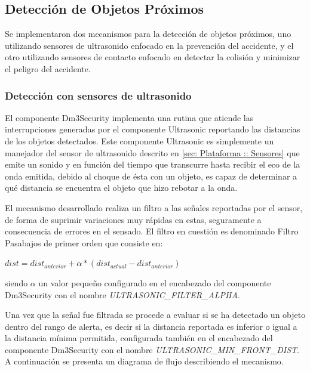 \documentclass[withindex,glossary]{cam-thesis}
\begin{document}
\subsection{Detección de Objetos Próximos} \label{sec:Implementacion :: detección de objetos próximos}
Se implementaron dos mecanismos para la detección de objetos próximos, uno utilizando sensores de ultrasonido enfocado en la prevención del accidente, y el otro utilizando sensores de contacto enfocado en detectar la colisión y minimizar el peligro del accidente.

\subsubsection{Detección con sensores de ultrasonido}
El componente Dm3Security implementa una rutina que atiende las interrupciones generadas por el componente Ultrasonic reportando las distancias de los objetos detectados. Este componente Ultrasonic es simplemente un manejador del sensor de ultrasonido descrito en \ref{sec: Plataforma :: Sensores} que emite un sonido y en función del tiempo que transcurre hasta recibir el eco de la onda emitida, debido al choque de ésta con un objeto, es capaz de determinar a qué distancia se encuentra el objeto que hizo rebotar a la onda.

El mecanismo desarrollado realiza un filtro a las señales reportadas por el sensor, de forma de suprimir variaciones muy rápidas en estas, seguramente a consecuencia de errores en el sensado. El filtro en cuestión es denominado Filtro Pasabajos \cite{FiltroPasabajos} de primer orden que consiste en:

\begin{center}
$dist = dist_{anterior} + \alpha * (dist_{actual} - dist_{anterior})$ 
\end{center}
siendo $\alpha$ un valor pequeño configurado en el encabezado del componente Dm3Security con el nombre \textit{ULTRASONIC\_FILTER\_ALPHA}.

Una vez que la señal fue filtrada se procede a evaluar si se ha detectado un objeto dentro del rango de alerta, es decir si la distancia reportada es inferior o igual a la distancia mínima permitida, configurada también en el encabezado del componente Dm3Security con el nombre \textit{ULTRASONIC\_MIN\_FRONT\_DIST}. A continuación se presenta un diagrama de flujo describiendo el mecanismo.
\end{document}
